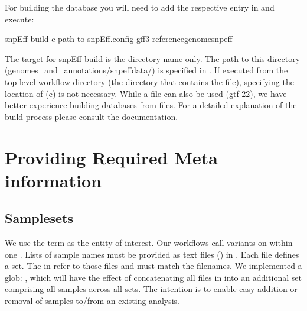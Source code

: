 \documentclass[letterpaper,10pt,english]{sphinxmanual}
\begin{document}
For building the database you will need to add the respective entry in  and execute:

\begin{sphinxVerbatim}[commandchars=\\\{\}]
\PYGZdl{} snpEff build \PYGZhy{}c \PYGZlt{}path to snpEff.config\PYGZgt{} \textendash{}gff3 \PYGZlt{}reference\PYGZhy{}genome\PYGZgt{}\PYGZus{}snpeff
\end{sphinxVerbatim}

The target for snpEff build is the directory name only. The path to this directory (genomes\_and\_annotations/snpeffdata/) is specified in . If executed from the top level workflow directory (the directory that contains the  file), specifying the location of  (\sphinxhyphen{}c) is not necessary.
While a  file can also be used (\sphinxhyphen{}gtf 22), we have better experience building databases from  files. For a detailed explanation of the  build process please consult the  documentation.


\section{Providing Required Meta information}
\label{\detokenize{index:providing-required-meta-information}}

\subsection{Samplesets}
\label{\detokenize{index:samplesets}}
We use the term  as the entity of interest. Our workflows call variants on  within one . Lists of sample names must be provided as text files () in . Each file defines a set. The  in  refer to those files and must match the filenames. We implemented a glob: , which will have the effect of concatenating all  files in  into an additional set comprising all samples across all sets. The intention is to enable easy addition or removal of samples to/from an existing analysis.
\end{document}
